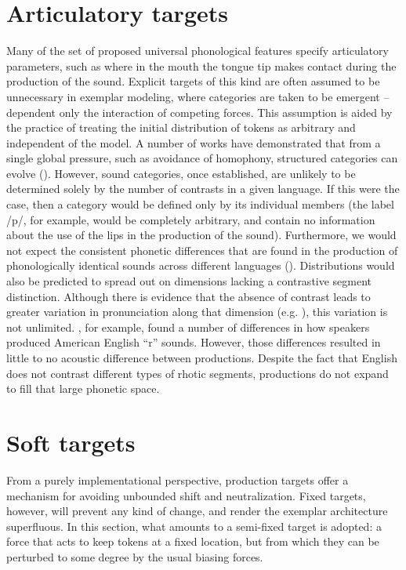 \section{Articulatory targets}

Many of the set of proposed universal phonological features specify
articulatory parameters, such as where in the mouth the tongue tip
makes contact during the production of the sound. Explicit targets
of this kind are often assumed to be unnecessary in exemplar modeling,
where categories are taken to be emergent – dependent only the interaction
of competing forces. This assumption is aided by the practice of treating
the initial distribution of tokens as arbitrary and independent of
the model. A number of works have demonstrated that from a single
global pressure, such as avoidance of homophony, structured categories
can evolve (\citealt{Boer2000,Wedel2006,soskuthy2013phonetic}). However,
sound categories, once established, are unlikely to be determined
solely by the number of contrasts in a given language. If this were
the case, then a category would be defined only by its individual
members (the label {/p/}, for example, would be completely
arbitrary, and contain no information about the use of the lips in
the production of the sound). Furthermore, we would not expect the
consistent phonetic differences that are found in the production of
phonologically identical sounds across different languages (\citealt{Keating1985}).
Distributions would also be predicted to spread out on dimensions
lacking a contrastive segment distinction. Although there is evidence
that the absence of contrast leads to greater variation in pronunciation
along that dimension (e.g. \citealt{choi1995acoustic}), this variation
is not unlimited. \citet{Baker2011}, for example, found a number
of differences in how speakers produced American English “r”
sounds. However, those differences resulted in little to no acoustic
difference between productions. Despite the fact that English does
not contrast different types of rhotic segments, productions do not
expand to fill that large phonetic space. 

\section{\label{subsec:Soft-Targets}Soft targets}

From a purely implementational perspective, production targets offer
a mechanism for avoiding unbounded shift and neutralization. Fixed
targets, however, will prevent any kind of change, and render the
exemplar architecture superfluous. In this section, what amounts to
a semi-fixed target is adopted: a force that acts to keep tokens at
a fixed location, but from which they can be perturbed to some degree
by the usual biasing forces. 

